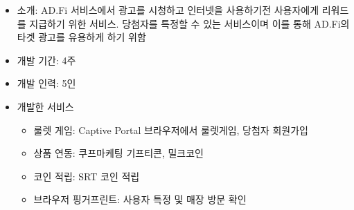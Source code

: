 \begin{itemize}[label=]
	\item 소개: AD.Fi 서비스에서 광고를 시청하고 인터넷을 사용하기전 사용자에게 리워드를 지급하기 위한 서비스. 당첨자를 특정할 수 있는 서비스이며 이를 통해 AD.Fi의 타겟 광고를 유용하게 하기 위함
	\item 개발 기간: 4주
	\item 개발 인력: 5인
	\item 개발한 서비스
	      \begin{itemize}[label=]
		      \item 룰렛 게임: Captive Portal 브라우저에서 룰렛게임, 당첨자 회원가입
		      \item 상품 연동: 쿠프마케팅 기프티콘, 밀크코인
		      \item 코인 적립: SRT 코인 적립
		      \item 브라우저 핑거프린트: 사용자 특정 및 매장 방문 확인
	      \end{itemize}
\end{itemize}


